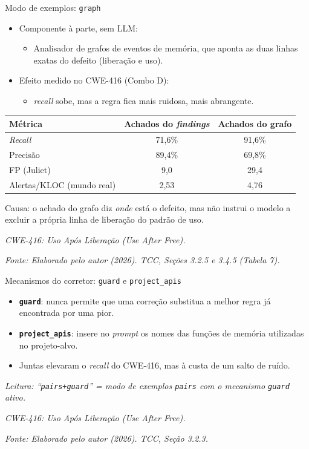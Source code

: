 \documentclass[
    aspectratio=169,
    12pt,
    brazil
]{beamer}
\newcommand{\fonte}[1]{{\tiny\itshape Fonte: #1\par}}
\begin{document}
\begin{frame}{Modo de exemplos: \texttt{graph}}
  \begin{itemize}
    \item Componente à parte, sem LLM: 
    \begin{itemize}
      \item Analisador de grafos de eventos de memória, que aponta as duas linhas exatas do defeito (liberação e uso).
    \end{itemize}
    \item Efeito medido no CWE-416 (Combo D): 
    \begin{itemize}
      \item \textit{recall} sobe, mas a regra fica mais ruidosa, mais abrangente.
    \end{itemize}
  \end{itemize}
  \begin{table}
  \small
  \begin{tabular}{lcc}
  \toprule
  \textbf{Métrica} & \textbf{Achados do \textit{findings}} & \textbf{Achados do grafo} \\
  \midrule
  \textit{Recall} & 71,6\% & 91,6\% \\
  Precisão & 89,4\% & 69,8\% \\
  FP (Juliet) & 9,0 & 29,4 \\
  Alertas/KLOC (mundo real) & 2,53 & 4,76 \\
  \bottomrule
  \end{tabular}
  \end{table}
  \footnotesize Causa: o achado do grafo diz \textit{onde} está o defeito, mas não instrui o modelo a excluir a própria linha de liberação do padrão de uso.
  \vspace{-0.14cm}
  \vfill
  {\tiny\itshape CWE-416: Uso Após Liberação (\textit{Use After Free}).\par}
  \fonte{Elaborado pelo autor (2026). TCC, Seções 3.2.5 e 3.4.5 (Tabela 7).}
\end{frame}

\begin{frame}{Mecanismos do corretor: \texttt{guard} e \texttt{project\_apis}}
  \begin{itemize}
    \item \textbf{\texttt{guard}}: nunca permite que uma correção substitua a melhor regra já encontrada por uma pior.
    \item \textbf{\texttt{project\_apis}}: insere no \textit{prompt} os nomes das funções de memória utilizadas no projeto-alvo.
    \item Juntas elevaram o \textit{recall} do CWE-416, mas à custa de um salto de ruído.
  \end{itemize}
  \vspace{0.15cm}
  \textit{\footnotesize Leitura: ``\texttt{pairs+guard}'' = modo de exemplos \texttt{pairs} com o mecanismo \texttt{guard} ativo.}
  \vfill
  {\tiny\itshape CWE-416: Uso Após Liberação (\textit{Use After Free}).\par}
  \fonte{Elaborado pelo autor (2026). TCC, Seção 3.2.3.}
\end{frame}
\end{document}
